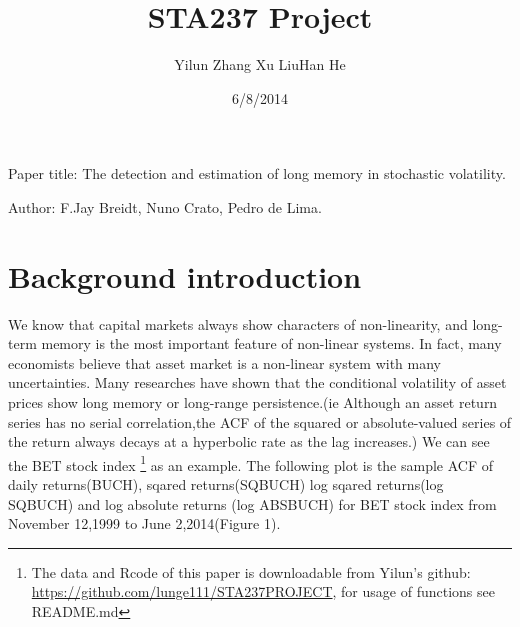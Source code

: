 \documentclass[10pt,a4paper]{article}
\title{\huge STA237 Project}
\date{6/8/2014}
\author[1]{Yilun Zhang \qquad  Xu Liu\qquad Han He}
\begin{document}
\maketitle
\begin{center} Paper title: The detection and estimation of long memory in stochastic volatility.\end{center}

\begin{center} Author: F.Jay Breidt, Nuno Crato, Pedro de Lima.\end{center}

\section{Background introduction}

We know that capital markets always show characters of non-linearity, and long-term memory is the most important feature of non-linear systems. In fact, many economists believe that asset market is a non-linear system with many uncertainties. Many researches have shown that the conditional volatility of asset prices show long memory or long-range persistence.(ie Although an asset return series has no serial correlation,the ACF of the squared or absolute-valued series of the return always decays at a hyperbolic rate as the lag increases.) We can see the BET stock index  \footnote[1]{The data and Rcode of this paper is downloadable from Yilun's github: \url{https://github.com/lunge111/STA237PROJECT}, for usage of functions see README.md} as an example. The following plot is the sample ACF of daily returns(BUCH), sqared returns(SQBUCH) log sqared returns(log SQBUCH) and log absolute returns (log ABSBUCH) for BET stock index from November 12,1999 to June 2,2014(Figure 1).
\end{document}

